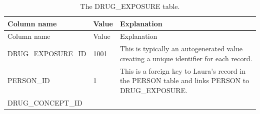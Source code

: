 \documentclass[11pt]{book}
\theoremstyle{definition}
\theoremstyle{definition}
\theoremstyle{definition}
\theoremstyle{remark}
\begin{document}
\begin{longtable}[]{@{}lll@{}}
\caption{\label{tab:drugExposure} The DRUG\_EXPOSURE table.}\tabularnewline
\toprule
\begin{minipage}[b]{0.28\columnwidth}\raggedright
Column name\strut
\end{minipage} & \begin{minipage}[b]{0.15\columnwidth}\raggedright
Value\strut
\end{minipage} & \begin{minipage}[b]{0.49\columnwidth}\raggedright
Explanation\strut
\end{minipage}\tabularnewline
\midrule
\endfirsthead
\toprule
\begin{minipage}[b]{0.28\columnwidth}\raggedright
Column name\strut
\end{minipage} & \begin{minipage}[b]{0.15\columnwidth}\raggedright
Value\strut
\end{minipage} & \begin{minipage}[b]{0.49\columnwidth}\raggedright
Explanation\strut
\end{minipage}\tabularnewline
\midrule
\endhead
\begin{minipage}[t]{0.28\columnwidth}\raggedright
DRUG\_EXPOSURE\_ID\strut
\end{minipage} & \begin{minipage}[t]{0.15\columnwidth}\raggedright
1001\strut
\end{minipage} & \begin{minipage}[t]{0.49\columnwidth}\raggedright
This is typically an autogenerated value creating a unique identifier for each record.\strut
\end{minipage}\tabularnewline
\begin{minipage}[t]{0.28\columnwidth}\raggedright
PERSON\_ID\strut
\end{minipage} & \begin{minipage}[t]{0.15\columnwidth}\raggedright
1\strut
\end{minipage} & \begin{minipage}[t]{0.49\columnwidth}\raggedright
This is a foreign key to Laura's record in the PERSON table and links PERSON to DRUG\_EXPOSURE.\strut
\end{minipage}\tabularnewline
\begin{minipage}[t]{0.28\columnwidth}\raggedright
DRUG\_CONCEPT\_ID\strut
\end{minipage} & \begin{minipage}[t]{0.15\columnwidth}\raggedright

\end{minipage}
\end{longtable}
\end{document}
